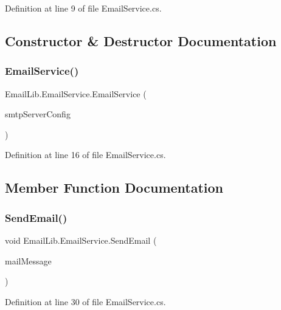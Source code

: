 Definition at line 9 of file Email\+Service.\+cs.



\subsection{Constructor \& Destructor Documentation}
\mbox{\label{classEmailLib_1_1EmailService_a596b152428b762b746230594ed280b96}} 
\subsubsection{\texorpdfstring{EmailService()}{EmailService()}}
{\footnotesize\ttfamily Email\+Lib.\+Email\+Service.\+Email\+Service (\begin{DoxyParamCaption}\item[{\mbox{\hyperlink{classEmailLib_1_1SmtpServerConfig}{Smtp\+Server\+Config}}}]{smtp\+Server\+Config }\end{DoxyParamCaption})}



Definition at line 16 of file Email\+Service.\+cs.



\subsection{Member Function Documentation}
\mbox{\label{classEmailLib_1_1EmailService_a5754177186440d4f6e2053e6c4632c4d}} 
\subsubsection{\texorpdfstring{SendEmail()}{SendEmail()}}
{\footnotesize\ttfamily void Email\+Lib.\+Email\+Service.\+Send\+Email (\begin{DoxyParamCaption}\item[{Mail\+Message}]{mail\+Message }\end{DoxyParamCaption})}



Definition at line 30 of file Email\+Service.\+cs.



